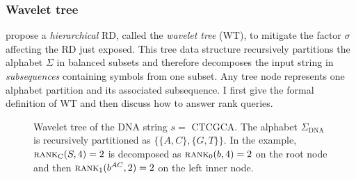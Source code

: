 
\subsubsection{Wavelet tree}

\citeauthor{Grossi2003} propose a \emph{hierarchical} RD, called the \emph{wavelet tree} (WT), to mitigate the factor $\sigma$ affecting the RD just exposed.
This tree data structure recursively partitions the alphabet $\Sigma$ in balanced subsets and therefore decomposes the input string in \emph{subsequences} containing symbols from one subset.
Any tree node represents one alphabet partition and its associated subsequence.
I first give the formal definition of WT and then discuss how to answer rank queries.


\begin{figure}[b]
\begin{center}
\caption[Example of wavelet tree]{Wavelet tree of the DNA string $s=$ {\ttfamily CTCGCA}. The alphabet $\Sigma_{\text{DNA}}$ is recursively partitioned as $\{ \{A,C\}, \{G,T\} \}$. In the example, $\textsc{rank}_{\text{C}}(S,4)=2$ is decomposed as $\textsc{rank}_0(b,4) = 2$ on the root node and then $\textsc{rank}_1(b^{AC}, 2) = 2$ on the left inner node.}
\label{fig:wt_dna}
\ttfamily

\end{center}
\end{figure}

